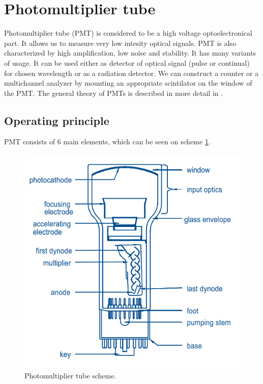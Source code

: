 \section{Photomultiplier tube}
Photomultiplier tube (PMT) is considered to be a high voltage optoelectronical part. It allows us to measure very low intesity optical signals. PMT is also characterized by high amplification, low noise and stability. It has many variants of usage. It can be used either as detector of optical signal (pulse or continual) for chosen wavelength or as a radiation detector. We can construct a counter or a multichannel analyzer by mounting an appropriate scintilator on the window of the PMT. The general theory of PMTs is described in more detail in \cite{Photonis, Hamamatsu}. 
\subsection{Operating principle}
PMT consists of 6 main elements, which can be seen on scheme \ref{PMT scheme}.

\begin{figure}[H]
 \centering
 \includegraphics[scale = 0.5]{./pictures/PMTscheme}
 \caption{Photomultiplier tube scheme\cite{Photonis}.}
 \label{PMT scheme}
\end{figure}

